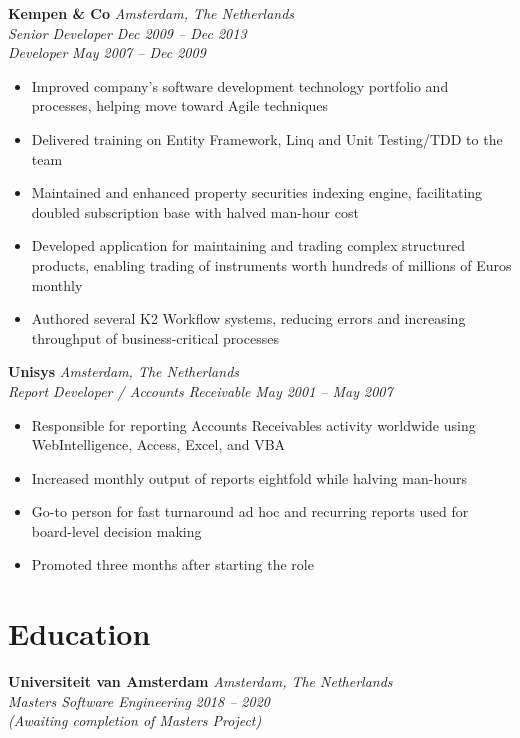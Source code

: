\documentclass[11pt,a4paper]{article}
\begin{document}
\textbf{Kempen \& Co} \hfill \textit{Amsterdam, The Netherlands}\\
\textit{Senior Developer} \hfill \textit{Dec 2009 -- Dec 2013}\\
\textit{Developer} \hfill \textit{May 2007 -- Dec 2009}
\begin{itemize}[leftmargin=*]
    \item Improved company's software development technology portfolio and processes, helping move toward Agile techniques
    \item Delivered training on Entity Framework, Linq and Unit Testing/TDD to the team
    \item Maintained and enhanced property securities indexing engine, facilitating doubled subscription base with halved man-hour cost
    \item Developed application for maintaining and trading complex structured products, enabling trading of instruments worth hundreds of millions of Euros monthly
    \item Authored several K2 Workflow systems, reducing errors and increasing throughput of business-critical processes
\end{itemize}

\textbf{Unisys} \hfill \textit{Amsterdam, The Netherlands}\\
\textit{Report Developer / Accounts Receivable} \hfill \textit{May 2001 -- May 2007}
\begin{itemize}[leftmargin=*]
    \item Responsible for reporting Accounts Receivables activity worldwide using WebIntelligence, Access, Excel, and VBA
    \item Increased monthly output of reports eightfold while halving man-hours
    \item Go-to person for fast turnaround ad hoc and recurring reports used for board-level decision making
    \item Promoted three months after starting the role
\end{itemize}

\section{Education}
\textbf{Universiteit van Amsterdam} \hfill \textit{Amsterdam, The Netherlands}\\
\textit{Masters Software Engineering} \hfill \textit{2018 -- 2020}\\
\textit{(Awaiting completion of Masters Project)}
\end{document}
